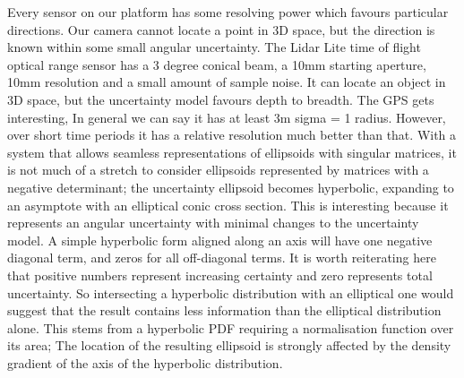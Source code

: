 \documentclass{article}
\newcounter{subsubsubsection}[subsubsection]
\begin{document}
        Every sensor on our platform has some resolving power which favours particular directions.
        Our camera cannot locate a point in 3D space, but the direction is known within some small angular uncertainty.
        The Lidar Lite time of flight optical range sensor has a 3 degree conical beam, a 10mm starting aperture, 10mm resolution and a small amount of sample noise. It can locate an object in 3D space, but the uncertainty model favours depth to breadth.
        The GPS gets interesting, In general we can say it has at least 3m sigma = 1 radius. However, over short time periods it has a relative resolution much better than that.
        \label{sec:hyperbolicCase}
        With a system that allows seamless representations of ellipsoids with singular matrices, it is not much of a stretch to consider ellipsoids represented by matrices with a negative determinant; the uncertainty ellipsoid becomes hyperbolic, expanding to an asymptote with an elliptical conic cross section.  This is interesting because it represents an angular uncertainty with minimal changes to the uncertainty model.
        A simple hyperbolic form aligned along an axis will have one negative diagonal term, and zeros for all off-diagonal terms.
        It is worth reiterating here that positive numbers represent increasing certainty and zero represents total uncertainty.  So intersecting a hyperbolic distribution with an elliptical one would suggest that the result contains less information than the elliptical distribution alone.
        This stems from a hyperbolic PDF requiring a normalisation function over its area;  The location of the resulting ellipsoid is strongly affected by the density gradient of the axis of the hyperbolic distribution.
\end{document}
